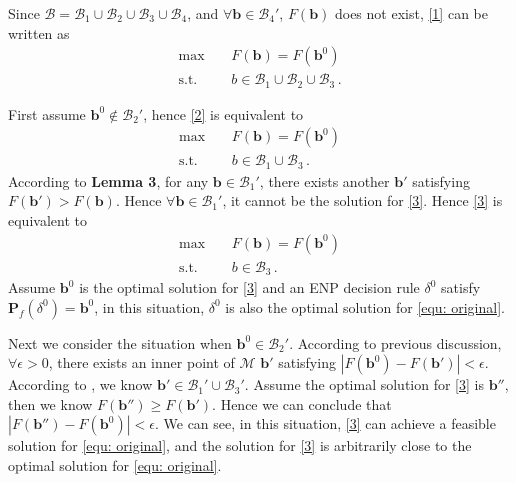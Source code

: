 \documentclass[12pt,journal,a4paper,twoside,onecolumn]{IEEEtran}
\begin{document}
\begin{spacing}{2.5}
Since $\mathcal{B} = \mathcal{B}_1 \cup \mathcal{B}_2 \cup \mathcal{B}_3 \cup \mathcal{B}_4$, and $\forall \mathbf{b} \in \mathcal{B}_4'$, $F(\mathbf{b})$ does not exist, \eqref{1} can be written as
\begin{equation}
\begin{split}
\label{2}
\max\;\;\;\;&F(\mathbf{b}) = F(\mathbf{b}^0)\\
\text{s.t.}\;\;\;\;&b \in \mathcal{B}_1 \cup \mathcal{B}_2 \cup \mathcal{B}_3\,.
\end{split}
\end{equation}

First assume $\mathbf{b}^0 \notin \mathcal{B}_2'$, hence \eqref{2} is equivalent to
\begin{equation}
\begin{split}
\label{3}
\max\;\;\;\;&F(\mathbf{b}) = F(\mathbf{b}^0)\\
\text{s.t.}\;\;\;\;&b \in \mathcal{B}_1 \cup \mathcal{B}_3\,.
\end{split}
\end{equation}
According to \textbf{Lemma 3}, for any $\mathbf{b} \in \mathcal{B}_1'$, there exists another $\mathbf{b}'$ satisfying $F(\mathbf{b}') > F(\mathbf{b})$. Hence $\forall \mathbf{b} \in \mathcal{B}_1'$, it cannot be the solution for \eqref{3}. Hence \eqref{3} is equivalent to 
\begin{equation}
\begin{split}
\label{3}
\max\;\;\;\;&F(\mathbf{b}) = F(\mathbf{b}^0)\\
\text{s.t.}\;\;\;\;&b \in  \mathcal{B}_3\,.
\end{split}
\end{equation}
Assume $\mathbf{b}^0$ is the optimal solution for \eqref{3} and an ENP decision rule $\delta^0$ satisfy $\mathbf{P}_f(\delta^0) = \mathbf{b}^0$, in this situation, $\delta^0$ is also the optimal solution for \eqref{equ: original}.

Next we consider the situation when $\mathbf{b}^0 \in \mathcal{B}_2'$.  According to previous discussion, $\forall \epsilon > 0$, there exists an inner point of $\mathcal{M}$ $\mathbf{b}'$ satisfying $|F(\mathbf{b}^0) - F(\mathbf{b}')| < \epsilon$. According to \cite{dantzig1951fundamental}, we know $\mathbf{b}' \in \mathcal{B}_1' \cup \mathcal{B}_3'$. Assume the optimal solution for \eqref{3} is $\mathbf{b}''$, then we know $F(\mathbf{b}'') \geq F(\mathbf{b}')$. Hence we can conclude that $|F(\mathbf{b}'') - F(\mathbf{b}^0)| < \epsilon$. We can see, in this situation, \eqref{3} can achieve a feasible solution for \eqref{equ: original}, and the solution for \eqref{3} is arbitrarily close to the optimal solution for \eqref{equ: original}.


\end{spacing}
\end{document}
